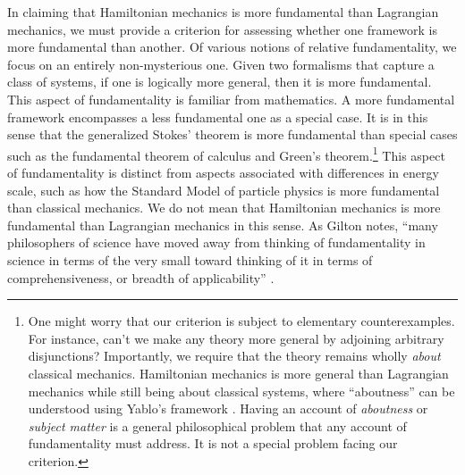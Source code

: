 \documentclass[12pt, twoside]{article}
\begin{document}
In claiming that Hamiltonian mechanics is more fundamental than Lagrangian mechanics, we must provide a criterion for assessing whether one framework is more fundamental than another. Of various notions of relative fundamentality, we focus on an entirely non-mysterious one. Given two formalisms that capture a class of systems, if one is logically more general, then it is more fundamental. This aspect of fundamentality is familiar from mathematics. A more fundamental framework encompasses a less fundamental one as a special case. It is in this sense that the generalized Stokes' theorem is more fundamental than special cases such as the fundamental theorem of calculus and Green's theorem.\footnote{One might worry that our criterion is subject to elementary counterexamples. For instance, can't we make any theory more general by adjoining arbitrary disjunctions? Importantly, we require that the theory remains wholly \textit{about} classical mechanics. Hamiltonian mechanics is more general than Lagrangian mechanics while still being about classical systems, where ``aboutness'' can be understood using Yablo's framework \parencites*[]{Yablo}. Having an account of \textit{aboutness} or \textit{subject matter} is a general philosophical problem that any account of fundamentality must address. It is not a special problem facing our criterion.}  This aspect of fundamentality is distinct from aspects associated with differences in energy scale, such as how the Standard Model of particle physics is more fundamental than classical mechanics. We do not mean that Hamiltonian mechanics is more fundamental than Lagrangian mechanics in this sense. As Gilton notes, ``many philosophers of science have moved away from thinking of fundamentality in science in terms of the very small toward thinking of it in terms of comprehensiveness, or breadth of applicability'' \parencites*[637]{Gilton2021}.
\end{document}
